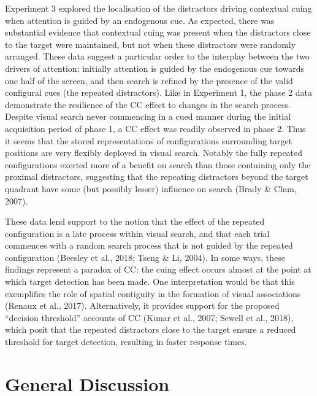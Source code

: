 \documentclass[
  man,floatsintext]{apa7}
\begin{document}
Experiment 3 explored the localisation of the distractors driving contextual cuing when attention is guided by an endogenous cue. As expected, there was substantial evidence that contextual cuing was present when the distractors close to the target were maintained, but not when these distractors were randomly arranged. These data suggest a particular order to the interplay between the two drivers of attention: initially attention is guided by the endogenous cue towards one half of the screen, and then search is refined by the presence of the valid configural cues (the repeated distractors). Like in Experiment 1, the phase 2 data demonstrate the resilience of the CC effect to changes in the search process. Despite visual search never commencing in a cued manner during the initial acquisition period of phase 1, a CC effect was readily observed in phase 2. Thus it seems that the stored representations of configurations surrounding target positions are very flexibly deployed in visual search. Notably the fully repeated configurations exerted more of a benefit on search than those containing only the proximal distractors, suggesting that the repeating distractors beyond the target quadrant have some (but possibly lesser) influence on search (Brady \& Chun, 2007).

These data lend support to the notion that the effect of the repeated configuration is a late process within visual search, and that each trial commences with a random search process that is not guided by the repeated configuration (Beesley et al., 2018; Tseng \& Li, 2004). In some ways, these findings represent a paradox of CC: the cuing effect occurs almost at the point at which target detection has been made. One interpretation would be that this exemplifies the role of spatial contiguity in the formation of visual associations (Renaux et al., 2017). Alternatively, it provides support for the proposed ``decision threshold'' accounts of CC (Kunar et al., 2007; Sewell et al., 2018), which posit that the repeated distractors close to the target ensure a reduced threshold for target detection, resulting in faster response times.

\hypertarget{general-discussion}{%
\section{General Discussion}\label{general-discussion}}
\end{document}
